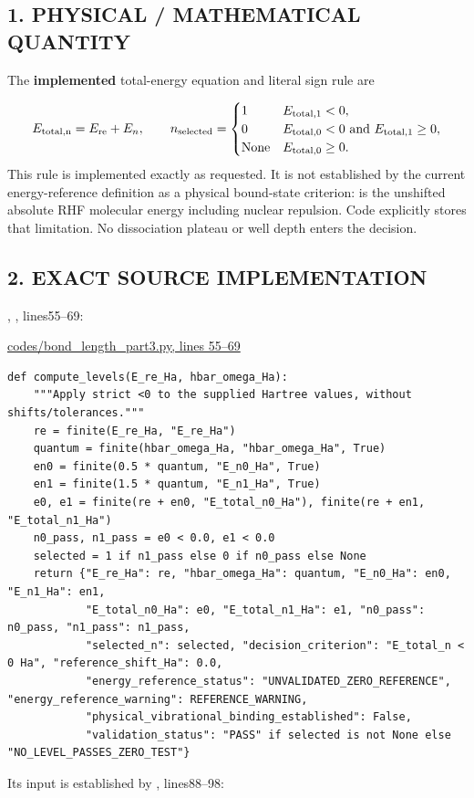 \documentclass[10pt,a4paper]{article}
\begin{document}
\subsection{1. PHYSICAL / MATHEMATICAL QUANTITY}
The \textbf{implemented} total-energy equation and literal sign rule are

\[
E_{\rm total,n}=E_{\rm re}+E_n,
\qquad
n_{\rm selected}=\begin{cases}
1&E_{\rm total,1}<0,\\
0&E_{\rm total,0}<0\ \text{and}\ E_{\rm total,1}\ge0,\\
\mathrm{None}&E_{\rm total,0}\ge0.
\end{cases}
\]
This rule is implemented exactly as requested. It is not established by the current energy-reference definition as a physical bound-state criterion:  is the unshifted absolute RHF molecular energy including nuclear repulsion. Code explicitly stores that limitation. No dissociation plateau or well depth enters the decision.

\subsection{2. EXACT SOURCE IMPLEMENTATION}
, , lines55–69:

\href{/Users/novaz/Desktop/qml2.0/codes/bond\_length\_part3.py:55}{codes/bond\_length\_part3.py, lines 55–69}

\begin{Verbatim}
def compute_levels(E_re_Ha, hbar_omega_Ha):
    """Apply strict <0 to the supplied Hartree values, without shifts/tolerances."""
    re = finite(E_re_Ha, "E_re_Ha")
    quantum = finite(hbar_omega_Ha, "hbar_omega_Ha", True)
    en0 = finite(0.5 * quantum, "E_n0_Ha", True)
    en1 = finite(1.5 * quantum, "E_n1_Ha", True)
    e0, e1 = finite(re + en0, "E_total_n0_Ha"), finite(re + en1, "E_total_n1_Ha")
    n0_pass, n1_pass = e0 < 0.0, e1 < 0.0
    selected = 1 if n1_pass else 0 if n0_pass else None
    return {"E_re_Ha": re, "hbar_omega_Ha": quantum, "E_n0_Ha": en0, "E_n1_Ha": en1,
            "E_total_n0_Ha": e0, "E_total_n1_Ha": e1, "n0_pass": n0_pass, "n1_pass": n1_pass,
            "selected_n": selected, "decision_criterion": "E_total_n < 0 Ha", "reference_shift_Ha": 0.0,
            "energy_reference_status": "UNVALIDATED_ZERO_REFERENCE", "energy_reference_warning": REFERENCE_WARNING,
            "physical_vibrational_binding_established": False,
            "validation_status": "PASS" if selected is not None else "NO_LEVEL_PASSES_ZERO_TEST"}
\end{Verbatim}
Its  input is established by , lines88–98:
\end{document}
